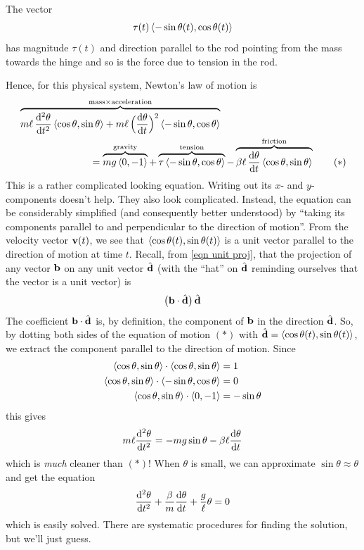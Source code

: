 The vector 
\begin{equation*}
\tau(t) \left< -\sin\theta(t),\cos\theta(t)\right> 
\end{equation*}
has magnitude $\tau(t)$ and direction parallel to the rod pointing 
from the mass towards the hinge and so is the force due to tension 
in the rod. 

Hence, for this physical system, Newton's law of motion is 
\begin{align}
&\overbrace{m\ell\,\ddiff{2}{\theta}{t}\llt \cos\theta,\sin\theta\rgt 
+m\ell\,\Big(\diff{\theta}{t}\Big)^2\llt -\sin\theta,\cos\theta\rgt}^
        {\text{mass}\times\text{acceleration}}
  \notag\\
&\hskip1in=
\overbrace{mg\llt 0,-1\rgt}^{\rm gravity} 
 +\overbrace{\tau \llt -\sin\theta,\cos\theta\rgt}^{\rm tension}
-\overbrace{\beta\ell\,\diff{\theta}{t}\llt \cos\theta,\sin\theta\rgt}^{\rm friction} 
\tag{$*$}
\end{align}
This is a rather complicated looking equation. Writing out its $x$- and
$y$-components doesn't help. They also look complicated.
Instead, the equation can be considerably simplified (and 
consequently better understood) by ``taking its components parallel to
and perpendicular to the direction of motion''. From the velocity vector
$\mathbf{v}(t)$, we see that $\left< \cos\theta(t),\sin\theta(t)\right> $ is a unit 
vector parallel to the direction of motion at time $t$.
Recall, from \eqref{eqn unit proj}, that the projection of any vector 
$\mathbf{b}$ on any unit vector $\hat{\mathbf{d}}$ 
(with the ``hat'' on $\hat{\mathbf{d}}$ reminding ourselves that the vector is a unit
vector) is
\begin{align*}
\big(\mathbf{b}\cdot \hat{\mathbf{d}}\big)\,\hat{\mathbf{d}}
\end{align*}
The coefficient $\mathbf{b}\cdot \hat{\mathbf{d}}$ is, by definition, the
component of $\mathbf{b}$ in the direction $\hat{\mathbf{d}}$.
So, by dotting both sides of the equation of motion $(*)$ with
$\hat{\mathbf{d}}=\left< \cos\theta(t),\sin\theta(t)\right> $, we extract the component 
parallel to the direction of motion. Since
\begin{align*}
\left< \cos\theta,\sin\theta\right> \cdot\left< \cos\theta,\sin\theta\right> &=1\\
\left< \cos\theta,\sin\theta\right> \cdot\left< -\sin\theta,\cos\theta\right> &=0\\
\left< \cos\theta,\sin\theta\right> \cdot\left< 0,-1\right> &=-\sin\theta
\end{align*}
this gives
\begin{align*} 
m\ell\ddiff{2}{\theta}{t}=-mg\sin\theta-\beta\ell\diff{\theta}{t}
\end{align*}
which is \emph{much} cleaner than $(*)$!
When $\theta$ is small, we can approximate $\sin\theta\approx\theta$ 
and get the equation
\begin{align*}
\ddiff{2}{\theta}{t}+\frac{\beta}{m}\diff{\theta}{t}+\frac{g}{\ell}\theta=0
\end{align*}
which is easily solved. There are systematic procedures for finding 
the solution, but we'll just guess. 

